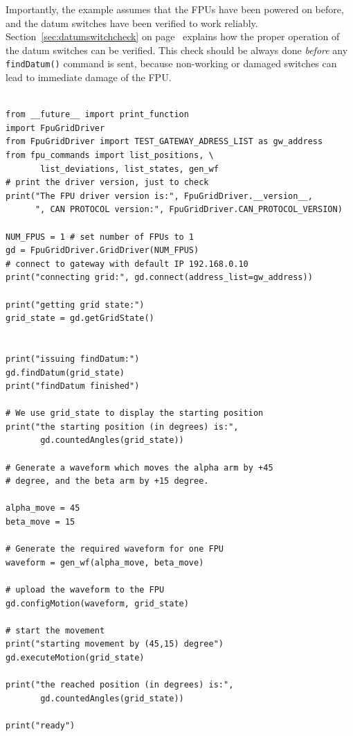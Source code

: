 \documentclass[11pt,a4paper]{scrartcl}
\begin{document}
Importantly, the example assumes that the FPUs have been powered on
before, and the datum switches have been verified to work
reliably. Section~\ref{sec:datumswitchcheck} on
page~\pageref{sec:datumswitchcheck} explains how the proper operation
of the datum switches can be verified. This check should be always
done \emph{before} any \texttt{findDatum()} command is sent, because
non-working or damaged switches can lead to immediate damage of the
FPU.


\begin{verbatim}

from __future__ import print_function
import FpuGridDriver
from FpuGridDriver import TEST_GATEWAY_ADRESS_LIST as gw_address
from fpu_commands import list_positions, \
       list_deviations, list_states, gen_wf
# print the driver version, just to check
print("The FPU driver version is:", FpuGridDriver.__version__,
      ", CAN PROTOCOL version:", FpuGridDriver.CAN_PROTOCOL_VERSION)

NUM_FPUS = 1 # set number of FPUs to 1
gd = FpuGridDriver.GridDriver(NUM_FPUS)
# connect to gateway with default IP 192.168.0.10
print("connecting grid:", gd.connect(address_list=gw_address))

print("getting grid state:")
grid_state = gd.getGridState()


print("issuing findDatum:")
gd.findDatum(grid_state)
print("findDatum finished")

# We use grid_state to display the starting position
print("the starting position (in degrees) is:",
       gd.countedAngles(grid_state))

# Generate a waveform which moves the alpha arm by +45
# degree, and the beta arm by +15 degree. 

alpha_move = 45
beta_move = 15

# Generate the required waveform for one FPU
waveform = gen_wf(alpha_move, beta_move)

# upload the waveform to the FPU
gd.configMotion(waveform, grid_state)

# start the movement
print("starting movement by (45,15) degree")
gd.executeMotion(grid_state)

print("the reached position (in degrees) is:",
       gd.countedAngles(grid_state))

print("ready")

\end{verbatim}
\end{document}
